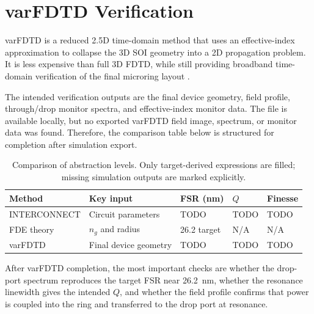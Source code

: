\section{varFDTD Verification}
varFDTD is a reduced 2.5D time-domain method that uses an effective-index approximation to collapse the 3D SOI geometry into a 2D propagation problem. It is less expensive than full 3D FDTD, while still providing broadband time-domain verification of the final microring layout \cite{labmanual}.

The intended verification outputs are the final device geometry, field profile, through/drop monitor spectra, and effective-index monitor data. The file  is available locally, but no exported varFDTD field image, spectrum, or monitor data was found. Therefore, the comparison table below is structured for completion after simulation export.

\begin{table}[H]
\centering
\caption{Comparison of abstraction levels. Only target-derived expressions are filled; missing simulation outputs are marked explicitly.}
\label{tab:method-comparison}
\begin{tabular}{lllll}
\toprule
Method & Key input & FSR (nm) & \(Q\) & Finesse \\
\midrule
INTERCONNECT & Circuit parameters & TODO & TODO & TODO \\
FDE theory & \(n_g\) and radius & 26.2 target & N/A & N/A \\
varFDTD & Final device geometry & TODO & TODO & TODO \\
\bottomrule
\end{tabular}
\end{table}

After varFDTD completion, the most important checks are whether the drop-port spectrum reproduces the target FSR near \SI{26.2}{\nano\metre}, whether the resonance linewidth gives the intended \(Q\), and whether the field profile confirms that power is coupled into the ring and transferred to the drop port at resonance.
